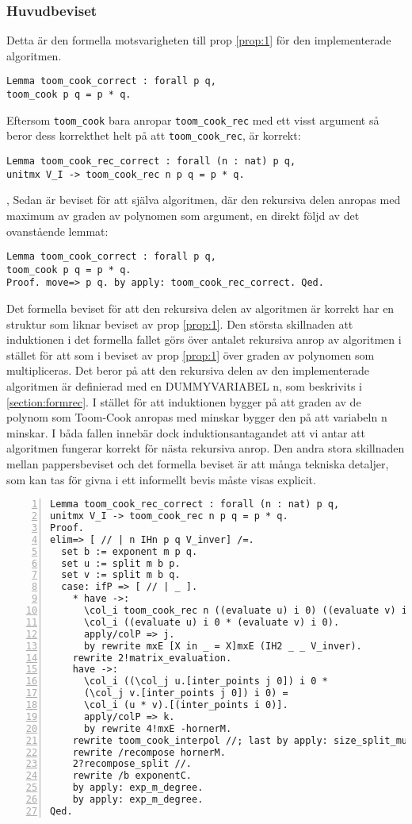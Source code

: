 \subsubsection{Huvudbeviset}
Detta är den formella motsvarigheten till prop \ref{prop:1} för den
implementerade algoritmen.
\begin{verbatim}
Lemma toom_cook_correct : forall p q,
toom_cook p q = p * q.
\end{verbatim}
Eftersom \verb+toom_cook+ bara anropar \verb+toom_cook_rec+ med ett visst
argument så beror dess korrekthet helt på att \verb+toom_cook_rec+, är korrekt:
\begin{verbatim}
Lemma toom_cook_rec_correct : forall (n : nat) p q,
unitmx V_I -> toom_cook_rec n p q = p * q.
\end{verbatim},
Sedan är beviset för att själva algoritmen, där den rekursiva delen anropas med
maximum av graden av polynomen som argument, en direkt följd av det ovanstående
lemmat:
\begin{verbatim}
Lemma toom_cook_correct : forall p q,
toom_cook p q = p * q.
Proof. move=> p q. by apply: toom_cook_rec_correct. Qed.
\end{verbatim}
Det formella beviset för att den rekursiva delen av algoritmen är korrekt har
en struktur som liknar beviset av prop \ref{prop:1}. Den största skillnaden att
induktionen i det formella fallet görs över antalet rekursiva anrop av
algoritmen i stället för att som i beviset av prop \ref{prop:1} över graden av
polynomen som multipliceras. Det beror på att den rekursiva delen av den
implementerade algoritmen är definierad med en DUMMYVARIABEL n, som beskrivits
i \ref{section:formrec}. I stället för att induktionen bygger på att graden av
de polynom som Toom-Cook anropas med minskar bygger den på att variabeln n
minskar. I båda fallen innebär dock induktionsantagandet att vi antar att
algoritmen fungerar korrekt för nästa rekursiva anrop. Den andra stora
skillnaden mellan pappersbeviset och det formella beviset är att många tekniska
detaljer, som kan tas för givna i ett informellt bevis måste visas explicit.
\begin{Verbatim}[numbers=left]
Lemma toom_cook_rec_correct : forall (n : nat) p q,
unitmx V_I -> toom_cook_rec n p q = p * q.
Proof.
elim=> [ // | n IHn p q V_inver] /=.
  set b := exponent m p q.
  set u := split m b p.
  set v := split m b q.
  case: ifP => [ // | _ ].
    * have ->:
      \col_i toom_cook_rec n ((evaluate u) i 0) ((evaluate v) i 0) =
      \col_i ((evaluate u) i 0 * (evaluate v) i 0).
      apply/colP => j.
      by rewrite mxE [X in _ = X]mxE (IH2 _ _ V_inver).
    rewrite 2!matrix_evaluation.
    have ->:
      \col_i ((\col_j u.[inter_points j 0]) i 0 *
      (\col_j v.[inter_points j 0]) i 0) =
      \col_i (u * v).[(inter_points i 0)].
      apply/colP => k.
      by rewrite 4!mxE -hornerM.
    rewrite toom_cook_interpol //; last by apply: size_split_mul.
    rewrite /recompose hornerM.
    2?recompose_split //.
    rewrite /b exponentC.
    by apply: exp_m_degree.
    by apply: exp_m_degree.
Qed.
\end{Verbatim}

